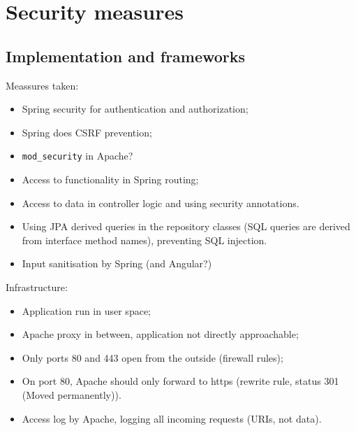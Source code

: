 \documentclass{report}
\begin{document}
\chapter{Security measures}

\section{Implementation and frameworks}

Meassures taken:
\begin{itemize}
\item Spring security for authentication and authorization;
\item Spring does CSRF prevention;
\item \texttt{mod\_security} in Apache?
\item Access to functionality in Spring routing;
\item Access to data in controller logic and using security annotations.
\item Using JPA derived queries in the repository classes 
(SQL queries are derived from interface method names), preventing SQL injection.
\item Input sanitisation by Spring (and Angular?)
\end{itemize}

Infrastructure:
\begin{itemize}
\item Application run in user space;
\item Apache proxy in between, application not directly approachable;
\item Only ports 80 and 443 open from the outside (firewall rules);
\item On port 80, Apache should only forward to https (rewrite rule, 
status 301 (Moved permanently)).
\item Access log by Apache, logging all incoming requests (URIs, not data).
\end{itemize}
\end{document}
